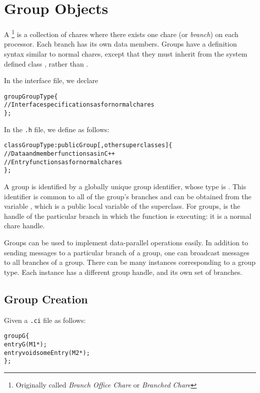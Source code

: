 \section{Group Objects}

A \footnote{Originally called {\em Branch Office Chare} or 
{\em Branched Chare}} is a collection of chares where 
there exists one chare (or {\sl branch}) on each
processor.   Each branch has its own data members.  Groups have
a definition syntax similar to normal chares, except that they must
inherit from the system defined class , rather than
.

In the interface file, we declare

\begin{alltt}
 group GroupType \{
   // Interface specifications as for normal chares
 \};
\end{alltt}

In the \texttt{.h} file, we define  as follows:

\begin{alltt}
 class GroupType : public Group [,other superclasses ] \{
  // Data and member functions as in C++
  // Entry functions as for normal chares
 \};
\end{alltt}

A group is identified by a globally unique group identifier, whose type is
. This identifier is common to all of the group's branches and
can be obtained from the variable , which is a public local
variable of the  superclass.  For groups,  is the
handle of the particular branch in which the function is executing: it is a
normal chare handle.

Groups can be used to implement data-parallel operations easily.  In addition
to sending messages to a particular branch of a group, one can broadcast
messages to all branches of a group.  There can be many instances corresponding
to a group type.  Each instance has a different group handle, and its own set
of branches.

\subsection{Group Creation}

Given a \texttt{.ci} file as follows:

\begin{alltt}
group G \{
  entry G(M1 *);
  entry void someEntry(M2 *);
\};
\end{alltt}

